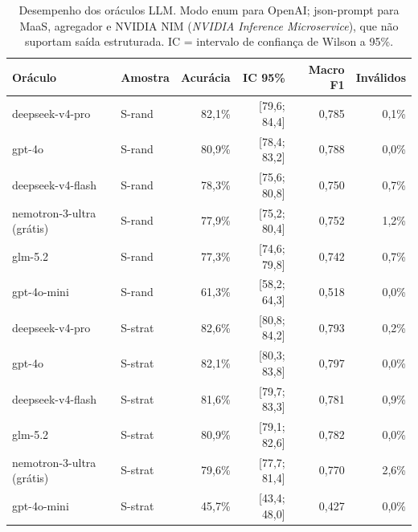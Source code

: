 \begin{table}[htb]
\centering
\caption{Desempenho dos oráculos LLM. Modo enum para OpenAI;
json-prompt para MaaS, agregador e NVIDIA NIM (\textit{NVIDIA Inference
Microservice}), que não suportam saída estruturada. IC = intervalo de
confiança de Wilson a 95\%.}
\label{tab:e0-principal}
\footnotesize
\begin{tabular}{l l rr r r}
\toprule
\textbf{Oráculo} & \textbf{Amostra} & \textbf{Acurácia} & \textbf{IC 95\%} &
\textbf{Macro F1} & \textbf{Inválidos} \\
\midrule
deepseek-v4-pro   & S-rand  & 82,1\% & [79,6; 84,4] & 0,785 & 0,1\% \\
gpt-4o            & S-rand  & 80,9\% & [78,4; 83,2] & 0,788 & 0,0\% \\
deepseek-v4-flash & S-rand  & 78,3\% & [75,6; 80,8] & 0,750 & 0,7\% \\
nemotron-3-ultra (grátis) & S-rand & 77,9\% & [75,2; 80,4] & 0,752 & 1,2\% \\
glm-5.2           & S-rand  & 77,3\% & [74,6; 79,8] & 0,742 & 0,7\% \\
gpt-4o-mini       & S-rand  & 61,3\% & [58,2; 64,3] & 0,518 & 0,0\% \\
\midrule
deepseek-v4-pro   & S-strat & 82,6\% & [80,8; 84,2] & 0,793 & 0,2\% \\
gpt-4o            & S-strat & 82,1\% & [80,3; 83,8] & 0,797 & 0,0\% \\
deepseek-v4-flash & S-strat & 81,6\% & [79,7; 83,3] & 0,781 & 0,9\% \\
glm-5.2           & S-strat & 80,9\% & [79,1; 82,6] & 0,782 & 0,0\% \\
nemotron-3-ultra (grátis) & S-strat & 79,6\% & [77,7; 81,4] & 0,770 & 2,6\% \\
gpt-4o-mini       & S-strat & 45,7\% & [43,4; 48,0] & 0,427 & 0,0\% \\
\bottomrule
\end{tabular}
\end{table}

